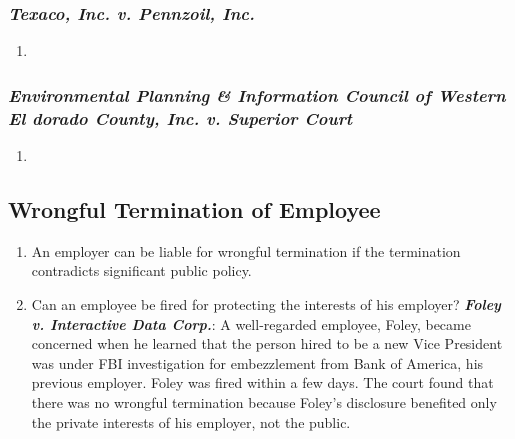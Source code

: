 \subsubsection{\emph{Texaco, Inc. v. Pennzoil, Inc.}}

\begin{enumerate}
    \item %
\end{enumerate}

\subsubsection{\emph{Environmental Planning \& Information Council of Western 
El dorado County, Inc. v. Superior Court}}

\begin{enumerate}
    \item %
\end{enumerate}





\subsection{Wrongful Termination of Employee}

\begin{enumerate}
    \item An employer can be liable for wrongful termination if the 
    termination contradicts significant public policy.
    \item Can an employee be fired for protecting the interests of his 
    employer? \textbf{\emph{Foley v. Interactive Data Corp.}}: A well-regarded 
    employee, Foley, became concerned when he learned that the person hired to 
    be a new Vice President was under FBI investigation for embezzlement from 
    Bank of America, his previous employer. Foley was fired within a few days. 
    The court found that there was no wrongful termination because Foley's 
    disclosure benefited only the private interests of his employer, not the 
    public.
    

\end{enumerate}

